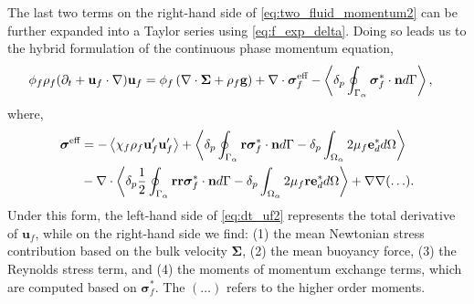 The last two terms on the right-hand side of \ref{eq:two_fluid_momentum2} can be further expanded into a Taylor series using \ref{eq:f_exp_delta}.
Doing so leads us to the hybrid formulation of the continuous phase momentum  equation, %
\begin{align}
    \phi_f \rho_f(\pddt + \textbf{u}_f  \cdot \grad) \textbf{u}_f
    &= \phi_f 
    \left(\div \bm{\Sigma}
    + \rho_f \textbf{g}\right)
    + \div \bm\sigma_f^{\text{eff}}
    - \pSavg{\bm\sigma_f^{*}\cdot \textbf{n}}, 
    \label{eq:dt_uf2}
\end{align}
where,
\begin{align}
    \bm{\sigma}^{\text{eff}} 
    &= 
    - \avg{\chi_f\rho_f \textbf{u}_f'\textbf{u}_f'} 
    + \pavg{\intS{\textbf{r}\bm\sigma^{*}_f\cdot \textbf{n}} - \delta_p\intO{2\mu_f\textbf{e}_d^*}}\nonumber\\
    &- \div
        \pavg{ \frac{1}{2}\intS{\textbf{rr}\bm\sigma^{*}_f\cdot \textbf{n}}
        - \delta_p\intO{2\mu_f \textbf{r} \textbf{e}_d^*}}
        + \grad\grad (\ldots). 
    \label{eq:def_sigma_eff_f2}
\end{align}
Under this form, the left-hand side of \ref{eq:dt_uf2} represents the total derivative of $\textbf{u}_f$, while on the right-hand side we find: (1) the mean Newtonian stress contribution based on the bulk velocity $\bm\Sigma$, (2) the mean buoyancy force, (3) the Reynolds stress term, and (4) the moments of momentum exchange terms, which are computed based on $\bm\sigma_f^*$.
The $(\ldots)$ refers to the higher order moments. 


